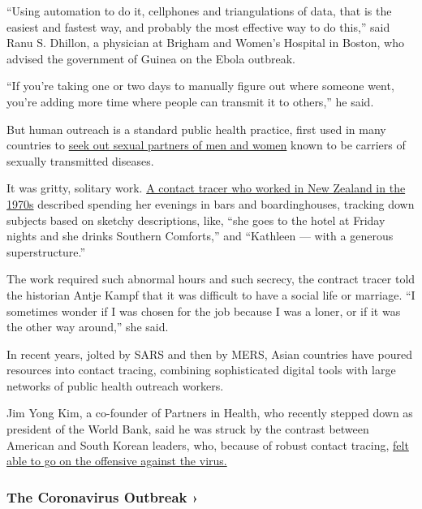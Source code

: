 ``Using automation to do it, cellphones and triangulations of data, that
is the easiest and fastest way, and probably the most effective way to
do this,'' said Ranu S. Dhillon, a physician at Brigham and Women's
Hospital in Boston, who advised the government of Guinea on the Ebola
outbreak.

``If you're taking one or two days to manually figure out where someone
went, you're adding more time where people can transmit it to others,''
he said.

But human outreach is a standard public health practice, first used in
many countries to
\href{https://academic.oup.com/shm/article-abstract/9/2/195/1643760?redirectedFrom=fulltext}{seek
out sexual partners of men and women} known to be carriers of sexually
transmitted diseases.

It was gritty, solitary work.
\href{https://www.ncbi.nlm.nih.gov/pubmed/18400831}{A contact tracer who
worked in New Zealand in the 1970s} described spending her evenings in
bars and boardinghouses, tracking down subjects based on sketchy
descriptions, like, ``she goes to the hotel at Friday nights and she
drinks Southern Comforts,'' and ``Kathleen --- with a generous
superstructure.''

The work required such abnormal hours and such secrecy, the contract
tracer told the historian Antje Kampf that it was difficult to have a
social life or marriage. ``I sometimes wonder if I was chosen for the
job because I was a loner, or if it was the other way around,'' she
said.

In recent years, jolted by SARS and then by MERS, Asian countries have
poured resources into contact tracing, combining sophisticated digital
tools with large networks of public health outreach workers.

Jim Yong Kim, a co-founder of Partners in Health, who recently stepped
down as president of the World Bank, said he was struck by the contrast
between American and South Korean leaders, who, because of robust
contact tracing,
\href{https://www.nytimes.com/2020/03/23/world/asia/coronavirus-south-korea-flatten-curve.html?searchResultPosition=1}{felt
able to go on the offensive against the virus.}

\href{https://www.nytimes.com/news-event/coronavirus?action=click\&pgtype=Article\&state=default\&region=MAIN_CONTENT_3\&context=storylines_faq}{}

\hypertarget{the-coronavirus-outbreak-}{%
\subsubsection{The Coronavirus Outbreak
›}\label{the-coronavirus-outbreak-}}

